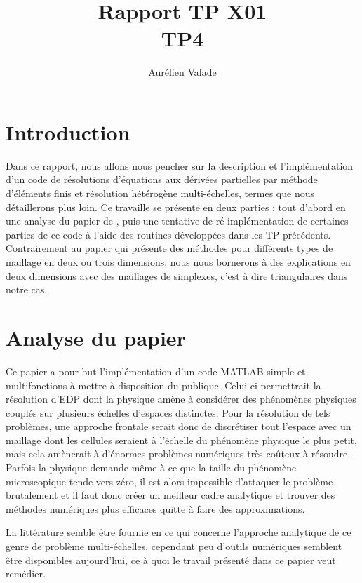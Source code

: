 \documentclass[11pt]{article}
\title{Rapport TP X01 \\ TP4}
\author{Aurélien Valade}
\date{}
\begin{document}
\maketitle

\section{Introduction}

Dans ce rapport, nous allons nous pencher sur la description et l'implémentation d'un code de résolutions d'équations aux dérivées partielles par méthode
d'éléments finis et résolution hétérogène multi-échelles, termes que nous détaillerons plus loin. Ce travaille se présente en deux parties : tout d'abord
en une analyse du papier de \cite{abdulle2009short}, puis une tentative de ré-implémentation de certaines parties de ce code à l'aide des routines développées
dans les TP précédents. Contrairement au papier qui présente des méthodes pour différents types de maillage en deux ou trois dimensions, nous nous
bornerons à des explications en deux dimensions avec des maillages de simplexes, c'est à dire triangulaires dans notre cas. 

\section{Analyse du papier}

Ce papier a pour but l'implémentation d'un code MATLAB simple et multifonctions à mettre à disposition du publique. Celui ci permettrait la résolution
d'EDP dont la physique amène à considérer des phénomènes physiques couplés sur plusieurs échelles d'espaces distinctes. Pour la résolution de tels
problèmes, une approche frontale serait donc de discrétiser tout l'espace avec un maillage dont les cellules seraient à l'échelle du phénomène physique le
plus petit, mais cela amènerait à d'énormes problèmes numériques très coûteux à résoudre. Parfois la physique demande même à ce que la taille du phénomène
microscopique tende vers zéro, il est alors impossible d'attaquer le problème brutalement et il faut donc créer un meilleur cadre analytique et trouver
des méthodes numériques plus efficaces quitte à faire des approximations.

La littérature semble être fournie en ce qui concerne l'approche analytique de ce genre de problème multi-échelles, cependant peu d'outils numériques
semblent être disponibles aujourd'hui, ce à quoi le travail présenté dans ce papier veut remédier. 
\end{document}
